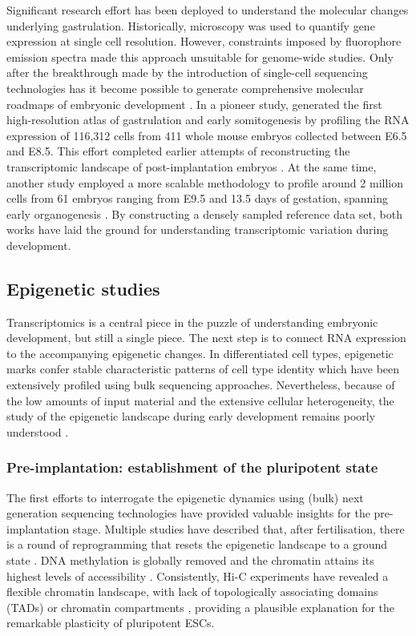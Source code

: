 Significant research effort has been deployed to understand the molecular changes underlying gastrulation. Historically, microscopy was used to quantify gene expression at single cell resolution. However, constraints imposed by fluorophore emission spectra made this approach unsuitable for genome-wide studies. Only after the breakthrough made by the introduction of single-cell sequencing technologies has it become possible to generate comprehensive molecular roadmaps of embryonic development \cite{Schaum2018,Pijuan-Sala2019,Cao2019,Aviv2017}. In a pioneer study, \cite{Pijuan-Sala2019} generated the first high-resolution atlas of gastrulation and early somitogenesis by profiling the RNA expression of 116,312 cells from 411 whole mouse embryos collected between E6.5 and E8.5. This effort completed earlier attempts of reconstructing the transcriptomic landscape of post-implantation embryos \cite{Mohammed2017,Scialdone2016,Ibarra-Soria2018,Wen2017}. At the same time, another study employed a more scalable methodology  to profile around 2 million cells from 61 embryos ranging from E9.5 and 13.5 days of gestation, spanning early organogenesis \cite{Cao2019}. By constructing a densely sampled reference data set, both works have laid the ground for understanding transcriptomic variation during development. 


\subsection{Epigenetic studies}

Transcriptomics is a central piece in the puzzle of understanding embryonic development, but still a single piece. The next step is to connect RNA expression to the accompanying epigenetic changes. In differentiated cell types, epigenetic marks confer stable characteristic patterns of cell type identity which have been extensively profiled using bulk sequencing approaches. Nevertheless, because of the low amounts of input material and the extensive cellular heterogeneity, the study of the epigenetic landscape during early development remains poorly understood \cite{Kelsey2017}.

\subsubsection{Pre-implantation: establishment of the pluripotent state}

The first efforts to interrogate the epigenetic dynamics using (bulk) next generation sequencing technologies have provided valuable insights for the pre-implantation stage. Multiple studies have described that, after fertilisation, there is a round of reprogramming that resets the epigenetic landscape to a ground state \cite{Smith2012,Lee2014}. DNA methylation is globally removed and the chromatin attains its highest levels of accessibility \cite{Wu2016}. Consistently, Hi-C experiments have revealed a flexible chromatin landscape, with lack of topologically associating domains (TADs) or chromatin compartments \cite{Ke2017,Du2017,Tee2014}, providing a plausible explanation for the remarkable plasticity of pluripotent ESCs.

